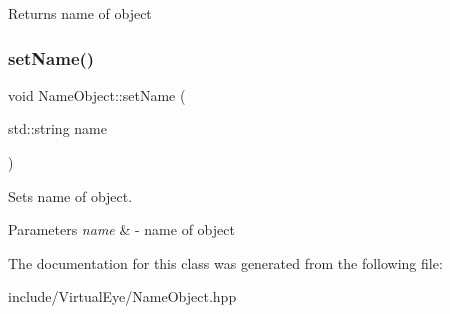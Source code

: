 \begin{DoxyReturn}{Returns}
name of object 
\end{DoxyReturn}
\hypertarget{class_name_object_a4172d35244e556278ae8b7dae238c16a}{}\label{class_name_object_a4172d35244e556278ae8b7dae238c16a} 
\subsubsection{\texorpdfstring{set\+Name()}{setName()}}
{\footnotesize\ttfamily void Name\+Object\+::set\+Name (\begin{DoxyParamCaption}\item[{std\+::string}]{name }\end{DoxyParamCaption})\hspace{0.3cm}{\ttfamily [inline]}}



Sets name of object. 


\begin{DoxyParams}{Parameters}
{\em name} & -\/ name of object \\
\hline
\end{DoxyParams}


The documentation for this class was generated from the following file\+:\begin{DoxyCompactItemize}
\item 
include/\+Virtual\+Eye/Name\+Object.\+hpp\end{DoxyCompactItemize}
